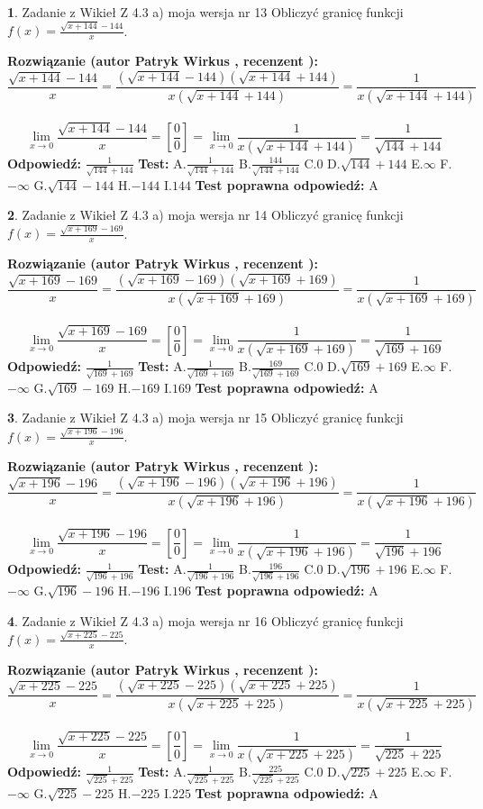 \documentclass[12pt, a4paper]{article}
\theoremstyle{definition} %
\newtheorem{zad}{}
\newcommand{\zadStart}[1]{\begin{zad}#1\newline}
\newcommand{\zadStop}{\end{zad}}
\newcommand{\rozwStart}[2]{\noindent \textbf{Rozwiązanie (autor #1 , recenzent #2): }\newline}
\newcommand{\rozwStop}{\newline}
\newcommand{\odpStart}{\noindent \textbf{Odpowiedź:}\newline}
\newcommand{\odpStop}{\newline}
\newcommand{\testStart}{\noindent \textbf{Test:}\newline}
\newcommand{\testStop}{\newline}
\newcommand{\kluczStart}{\noindent \textbf{Test poprawna odpowiedź:}\newline}
\newcommand{\kluczStop}{\newline}
\begin{document}
\zadStart{Zadanie z Wikieł Z 4.3 a) moja wersja nr 13}
Obliczyć granicę funkcji $f(x)=\frac{\sqrt{x+144}-144}{x}$.
\zadStop
\rozwStart{Patryk Wirkus}{}
$$\frac{\sqrt{x+144}-144}{x}=\frac{(\sqrt{x+144}-144)(\sqrt{x+144}+144)}{x(\sqrt{x+144}+144)}=\frac{1}{x(\sqrt{x+144}+144)}$$
\\
$$\lim\limits_{x\to0}\frac{\sqrt{x+144}-144}{x}=[\frac{0}{0}]=
\lim\limits_{x\to0}\frac{1}{x(\sqrt{x+144}+144)} = \frac{1}{\sqrt{144}+144}$$
\rozwStop
\odpStart
$\frac{1}{\sqrt{144}+144}$
\odpStop
\testStart
A.$\frac{1}{\sqrt{144}+144}$
B.$\frac{144}{\sqrt{144}+144}$
C.$0$
D.$\sqrt{144}+144$
E.$\infty$
F.$-\infty$
G.$\sqrt{144}-144$
H.$-144$
I.$144$
\testStop
\kluczStart
A
\kluczStop



\zadStart{Zadanie z Wikieł Z 4.3 a) moja wersja nr 14}
Obliczyć granicę funkcji $f(x)=\frac{\sqrt{x+169}-169}{x}$.
\zadStop
\rozwStart{Patryk Wirkus}{}
$$\frac{\sqrt{x+169}-169}{x}=\frac{(\sqrt{x+169}-169)(\sqrt{x+169}+169)}{x(\sqrt{x+169}+169)}=\frac{1}{x(\sqrt{x+169}+169)}$$
\\
$$\lim\limits_{x\to0}\frac{\sqrt{x+169}-169}{x}=[\frac{0}{0}]=
\lim\limits_{x\to0}\frac{1}{x(\sqrt{x+169}+169)} = \frac{1}{\sqrt{169}+169}$$
\rozwStop
\odpStart
$\frac{1}{\sqrt{169}+169}$
\odpStop
\testStart
A.$\frac{1}{\sqrt{169}+169}$
B.$\frac{169}{\sqrt{169}+169}$
C.$0$
D.$\sqrt{169}+169$
E.$\infty$
F.$-\infty$
G.$\sqrt{169}-169$
H.$-169$
I.$169$
\testStop
\kluczStart
A
\kluczStop



\zadStart{Zadanie z Wikieł Z 4.3 a) moja wersja nr 15}
Obliczyć granicę funkcji $f(x)=\frac{\sqrt{x+196}-196}{x}$.
\zadStop
\rozwStart{Patryk Wirkus}{}
$$\frac{\sqrt{x+196}-196}{x}=\frac{(\sqrt{x+196}-196)(\sqrt{x+196}+196)}{x(\sqrt{x+196}+196)}=\frac{1}{x(\sqrt{x+196}+196)}$$
\\
$$\lim\limits_{x\to0}\frac{\sqrt{x+196}-196}{x}=[\frac{0}{0}]=
\lim\limits_{x\to0}\frac{1}{x(\sqrt{x+196}+196)} = \frac{1}{\sqrt{196}+196}$$
\rozwStop
\odpStart
$\frac{1}{\sqrt{196}+196}$
\odpStop
\testStart
A.$\frac{1}{\sqrt{196}+196}$
B.$\frac{196}{\sqrt{196}+196}$
C.$0$
D.$\sqrt{196}+196$
E.$\infty$
F.$-\infty$
G.$\sqrt{196}-196$
H.$-196$
I.$196$
\testStop
\kluczStart
A
\kluczStop



\zadStart{Zadanie z Wikieł Z 4.3 a) moja wersja nr 16}
Obliczyć granicę funkcji $f(x)=\frac{\sqrt{x+225}-225}{x}$.
\zadStop
\rozwStart{Patryk Wirkus}{}
$$\frac{\sqrt{x+225}-225}{x}=\frac{(\sqrt{x+225}-225)(\sqrt{x+225}+225)}{x(\sqrt{x+225}+225)}=\frac{1}{x(\sqrt{x+225}+225)}$$
\\
$$\lim\limits_{x\to0}\frac{\sqrt{x+225}-225}{x}=[\frac{0}{0}]=
\lim\limits_{x\to0}\frac{1}{x(\sqrt{x+225}+225)} = \frac{1}{\sqrt{225}+225}$$
\rozwStop
\odpStart
$\frac{1}{\sqrt{225}+225}$
\odpStop
\testStart
A.$\frac{1}{\sqrt{225}+225}$
B.$\frac{225}{\sqrt{225}+225}$
C.$0$
D.$\sqrt{225}+225$
E.$\infty$
F.$-\infty$
G.$\sqrt{225}-225$
H.$-225$
I.$225$
\testStop
\kluczStart
A
\kluczStop
\end{document}
